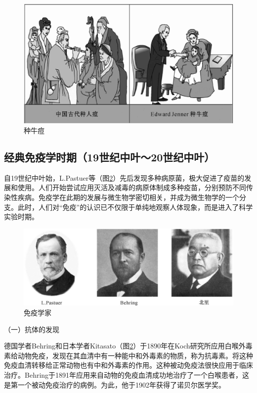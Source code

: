 \begin{figure}[!htbp]
 \centering
 \includegraphics{./images/Image00010.jpg}
 \caption{种牛痘}
 \label{fig1-3}
  \end{figure} 


\subsection{经典免疫学时期（19世纪中叶～20世纪中叶）}

自19世纪中叶始，L.Pastuer等（图\ref{fig1-4}）先后发现多种病原菌，极大促进了疫苗的发展和使用。人们开始尝试应用灭活及减毒的病原体制成多种疫苗，分别预防不同传染性疾病。免疫学在此期的发展与微生物学密切相关，并成为微生物学的一个分支。此时，人们对“免疫”的认识已不仅限于单纯地观察人体现象，而是进入了科学实验时期。

\begin{figure}[!htbp]
 \centering
 \includegraphics[width=.7\textwidth]{./images/Image00011.jpg}
 \caption{免疫学家}
 \label{fig1-4}
  \end{figure} 

（一）抗体的发现

德国学者Behring和日本学者Kitasato（图\ref{fig1-4}）于1890年在Koch研究所应用白喉外毒素给动物免疫，发现在其血清中有一种能中和外毒素的物质，称为抗毒素。将这种免疫血清转移给正常动物也有中和外毒素的作用。这种被动免疫法很快应用于临床治疗。Behring于1891年应用来自动物的免疫血清成功地治疗了一个白喉患者，这是第一个被动免疫治疗的病例。为此，他于1902年获得了诺贝尔医学奖。

